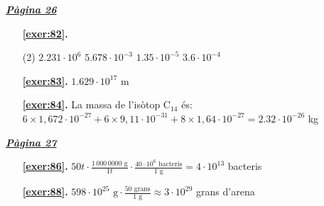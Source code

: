  \vspace{1cm} 
 

\vspace{0.3cm}


\hyperlink{page.26}{\textbf{\em Pàgina 26}}
\begin{enumerate}



 \item[\fontfamily{phv}\selectfont\color{blue}\textbf{\ref{exer:82}. }] \label{ans:82}
 \begin{tasks}[column-sep=1em, item-indent=1.3333em](2)
	 \task $2.231\cdot 10^6$
	 \task $5.678\cdot 10^{-3}$
	 \task $1.35\cdot 10^{-5}$
	 \task $3.6\cdot 10^{-4}$
\end{tasks}
 \end{enumerate}
\begin{enumerate}
\item[\fontfamily{phv}\selectfont\color{blue}\textbf{\ref{exer:83}. }] \label{ans:83} 
$1.629\cdot 10^{17}$ m
\item[\fontfamily{phv}\selectfont\color{blue}\textbf{\ref{exer:84}. }] \label{ans:84} 
La massa de l'isòtop C${}_{14}$ és: $6\times 1,672 \cdot 10^{-27} + 6 \times 9,11 \cdot 10^{-31}+ 8\times 1,64 \cdot 10^{-27} = 2.32\cdot 10^{-26}$ kg
 \end{enumerate}
\vspace{0.3cm}


\hyperlink{page.27}{\textbf{\em Pàgina 27}}
\begin{enumerate}
\item[\fontfamily{phv}\selectfont\color{blue}\textbf{\ref{exer:86}. }] \label{ans:86} 
$50 t \cdot \frac {1\,000\,0000 \text { g}}{1 t} \cdot \frac {40\cdot 10^6 \text { bacteris}}{1 \text { g}}=4\cdot 10^{13}$ bacteris
 \end{enumerate}
\begin{enumerate}
\item[\fontfamily{phv}\selectfont\color{blue}\textbf{\ref{exer:88}. }] \label{ans:88} 
$ 598 \cdot 10^{25} \text { g} \cdot \frac {50 \text { grans}}{1 \text { g}} \approx 3\cdot 10^{29}$ grans d'arena
 \end{enumerate}
\vspace{0.3cm}

